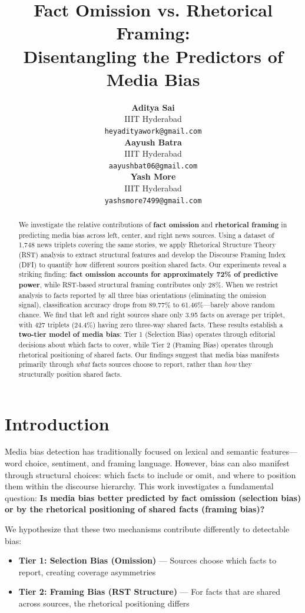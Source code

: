 \documentclass[11pt]{article}
\title{Fact Omission vs. Rhetorical Framing: \\
Disentangling the Predictors of Media Bias}
\author{
\begin{tabular}[t]{c}
\textbf{Aditya Sai} \\
IIIT Hyderabad \\
{\small\texttt{heyadityawork@gmail.com}}
\end{tabular}
\hspace{1.5cm}
\begin{tabular}[t]{c}
\textbf{Aayush Batra} \\
IIIT Hyderabad \\
{\small\texttt{aayushbat06@gmail.com}}
\end{tabular}
\hspace{1.5cm}
\begin{tabular}[t]{c}
\textbf{Yash More} \\
IIIT Hyderabad \\
{\small\texttt{yashsmore7499@gmail.com}}
\end{tabular}
}
\begin{document}
\maketitle

\begin{abstract}
We investigate the relative contributions of \textbf{fact omission} and \textbf{rhetorical framing} in predicting media bias across left, center, and right news sources. Using a dataset of 1,748 news triplets covering the same stories, we apply Rhetorical Structure Theory (RST) analysis to extract structural features and develop the Discourse Framing Index (DFI) to quantify how different sources position shared facts. Our experiments reveal a striking finding: \textbf{fact omission accounts for approximately 72\% of predictive power}, while RST-based structural framing contributes only 28\%. When we restrict analysis to facts reported by all three bias orientations (eliminating the omission signal), classification accuracy drops from 89.77\% to 61.46\%---barely above random chance. We find that left and right sources share only 3.95 facts on average per triplet, with 427 triplets (24.4\%) having zero three-way shared facts. These results establish a \textbf{two-tier model of media bias}: Tier 1 (Selection Bias) operates through editorial decisions about which facts to cover, while Tier 2 (Framing Bias) operates through rhetorical positioning of shared facts. Our findings suggest that media bias manifests primarily through \textit{what} facts sources choose to report, rather than \textit{how} they structurally position shared facts.
\end{abstract}

\section{Introduction}

Media bias detection has traditionally focused on lexical and semantic features---word choice, sentiment, and framing language. However, bias can also manifest through structural choices: which facts to include or omit, and where to position them within the discourse hierarchy. This work investigates a fundamental question: \textbf{Is media bias better predicted by fact omission (selection bias) or by the rhetorical positioning of shared facts (framing bias)?}

We hypothesize that these two mechanisms contribute differently to detectable bias:
\begin{itemize}
    \item \textbf{Tier 1: Selection Bias (Omission)} --- Sources choose which facts to report, creating coverage asymmetries
    \item \textbf{Tier 2: Framing Bias (RST Structure)} --- For facts that are shared across sources, the rhetorical positioning differs
\end{itemize}
\end{document}
